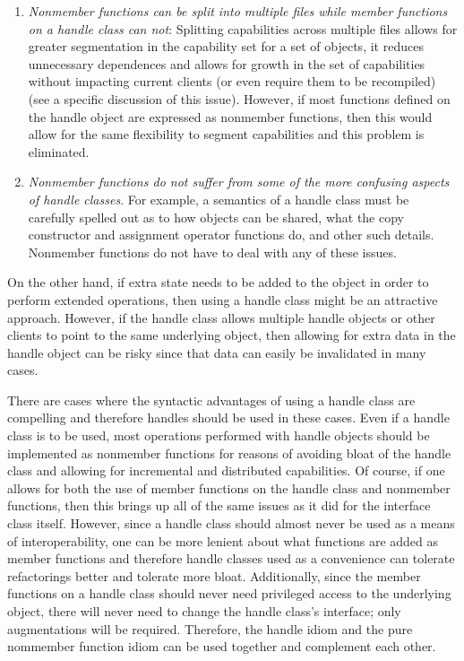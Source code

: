 \documentclass[pdf,ps2pdf,11pt]{SANDreport}
\begin{document}
\begin{enumerate}

{}\item{}\textit{Nonmember functions can be split into multiple files while
member functions on a handle class can not}: Splitting capabilities across
multiple files allows for greater segmentation in the capability set for a set
of objects, it reduces unnecessary dependences and allows for growth in the
set of capabilities without impacting current clients (or even require them to
be recompiled) (see {}\cite[Item 23]{EffectiveC++3rd} a specific discussion of
this issue).  However, if most functions defined on the handle object are
expressed as nonmember functions, then this would allow for the same
flexibility to segment capabilities and this problem is eliminated.

{}\item{}\textit{Nonmember functions do not suffer from some of the more
confusing aspects of handle classes}.  For example, a semantics of a handle
class must be carefully spelled out as to how objects can be shared, what the
copy constructor and assignment operator functions do, and other such details.
Nonmember functions do not have to deal with any of these issues.

\end{enumerate}

On the other hand, if extra state needs to be added to the object in order to
perform extended operations, then using a handle class might be an attractive
approach.  However, if the handle class allows multiple handle objects or
other clients to point to the same underlying object, then allowing for extra
data in the handle object can be risky since that data can easily be
invalidated in many cases.

There are cases where the syntactic advantages of using a handle class are
compelling and therefore handles should be used in these cases.  Even if a
handle class is to be used, most operations performed with handle objects
should be implemented as nonmember functions for reasons of avoiding bloat of
the handle class and allowing for incremental and distributed capabilities.
Of course, if one allows for both the use of member functions on the handle
class and nonmember functions, then this brings up all of the same issues as
it did for the interface class itself.  However, since a handle class should
almost never be used as a means of interoperability, one can be more lenient
about what functions are added as member functions and therefore handle
classes used as a convenience can tolerate refactorings better and tolerate
more bloat.  Additionally, since the member functions on a handle class should
never need privileged access to the underlying object, there will never need
to change the handle class's interface; only augmentations will be required.
Therefore, the handle idiom and the pure nommember function idiom can be used
together and complement each other.

\end{document}
